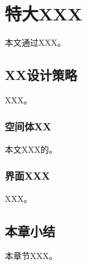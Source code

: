 
\chapter{特大XXX}

本文通过XXX。

\section{XX设计策略}

XXX。

\subsection{空间体XX}

本文XXX的。


\subsection{界面XXX}

XXX。

\section{本章小结}

本章节XXX。

